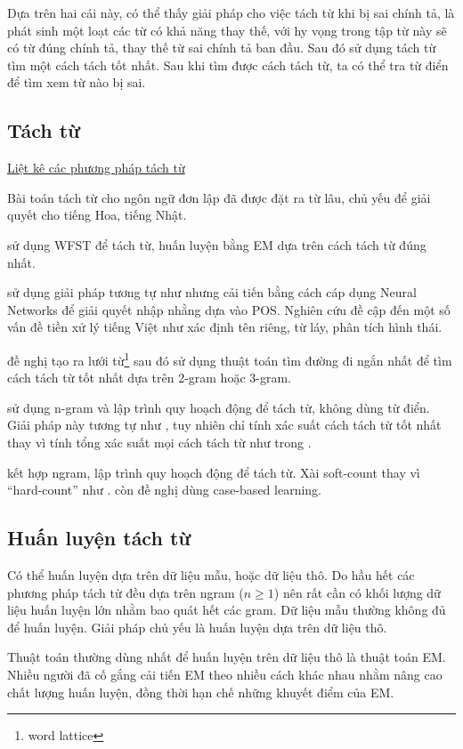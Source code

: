 \documentclass[a4paper,oneside]{book} %
\newcommand{\note}[1]{\underline{#1}}
\begin{document}
Dựa trên hai cái này, có thể thấy giải pháp cho việc tách từ khi bị
sai chính tả, là phát sinh một loạt các từ có khả năng thay thế, với
hy vọng trong tập từ này sẽ có từ đúng chính tả, thay thế từ sai chính
tả ban đầu. Sau đó sử dụng tách từ tìm một cách tách tốt nhất. Sau khi
tìm được cách tách từ, ta có thể tra từ điển để tìm xem từ nào bị sai.


\subsection{Tách từ}

\note{Liệt kê các phương pháp tách từ}

Bài toán tách từ cho ngôn ngữ đơn lập đã được đặt ra từ lâu, chủ yếu
để giải quyết cho tiếng Hoa, tiếng Nhật. 

\cite{Sproat} sử dụng WFST để tách từ, huấn luyện bằng EM dựa trên
cách tách từ đúng nhất.

\cite{wordseg} sử dụng giải pháp tương tự như \cite{Sproat} nhưng cải
tiến bằng cách cáp dụng Neural Networks để giải quyết nhập nhằng dựa
vào POS. Nghiên cứu đề cập đến một số vấn đề tiền xử lý tiếng Việt như
xác định tên riêng, từ láy, phân tích hình thái.

\cite{Ravishankar} đề nghị tạo ra lưới từ\footnote{word lattice} sau
đó sử dụng thuật toán tìm đường đi ngắn nhất để tìm cách tách từ tốt
nhất dựa trên 2-gram hoặc 3-gram.

\cite{LAH} sử dụng n-gram và lập trình quy hoạch động để tách từ,
không dùng từ điển. Giải pháp này tương tự như \cite{softcount}, tuy
nhiên chỉ tính xác suất cách tách từ tốt nhất thay vì tính tổng xác
suất mọi cách tách từ như trong \cite{softcount}.

\cite{Chunyu} kết hợp ngram, lập trình quy hoạch động để tách từ. Xài
soft-count thay vì ``hard-count'' như \cite{Chang}. \cite{Chunyu} còn
đề nghị dùng case-based learning.

\subsection{Huấn luyện tách từ}

Có thể huấn luyện dựa trên dữ liệu mẫu, hoặc dữ liệu thô. Do hầu hết
các phương pháp tách từ đều dựa trên ngram ($n\ge 1$) nên rất cần có
khối lượng dữ liệu huấn luyện lớn nhằm bao quát hết các gram. Dữ liệu
mẫu thường không đủ để huấn luyện. Giải pháp chủ yếu là huấn luyện dựa
trên dữ liệu thô.

Thuật toán thường dùng nhất để huấn luyện trên dữ liệu thô là thuật
toán EM. Nhiều người đã cố gắng cải tiến EM theo nhiều cách khác nhau
nhằm nâng cao chất lượng huấn luyện, đồng thời hạn chế những khuyết
điểm của EM. 
\end{document}
